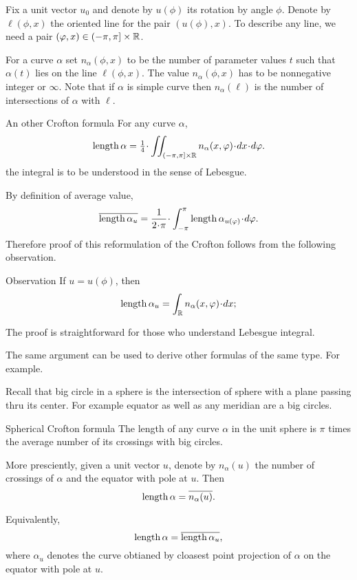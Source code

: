 Fix a unit vector $u_0$ and denote by $u(\phi)$ its rotation by angle $\phi$.
Denote by $\ell(\phi,x)$ the oriented line for the pair $(u(\phi),x)$.
To describe any line, we need a pair $(\varphi,x)\in (-\pi,\pi]\times \mathbb{R}$.

For a curve $\alpha$  set $n_\alpha(\phi,x)$ to be the number of parameter values $t$ such that $\alpha(t)$ lies on the line $\ell(\phi,x)$. 
The value $n_\alpha(\phi,x)$ has to be nonnegative integer or $\infty$.
Note that if $\alpha$ is simple curve then $n_\alpha(\ell)$ is the number of intersections of $\alpha$ with $\ell$.


\begin{thm}{An other Crofton formula}
For any curve $\alpha$,
\[\length\alpha=\tfrac14\cdot\iint_{(-\pi,\pi]\times \RR} n_\alpha(x,\phi)\cdot dx\cdot d\phi.\]
the integral is to be understood in the sense of Lebesgue.
\end{thm}

By definition of average value,
\[\overline{\length\alpha_u}
=
\frac1{2\cdot\pi}\cdot\int_{-\pi}^\pi \length\alpha_{u(\phi)}\cdot d\phi.\]
Therefore  proof of this reformulation of the Crofton follows from the following observation.

\begin{thm}{Observation}
If $u=u(\phi)$, then 
\[\length\alpha_u=\int_\RR n_\alpha(x,\phi)\cdot dx;\]

\end{thm}

The proof is straightforward for those who understand Lebesgue integral.

The same argument can be used to derive other formulas of the same type.
For example.

Recall that big circle in a sphere is the intersection of sphere with a plane passing thru its center.
For example equator as well as any meridian are a big circles.

\begin{thm}{Spherical Crofton formula}
The length of any curve $\alpha$ in the unit sphere is $\pi$ times the average number of its crossings with big circles.

More presciently, given a unit vector $u$, denote by $n_\alpha(u)$ the number of crossings of $\alpha$ and the equator with pole at $u$.
Then 
\[\mathop{\rm length}\nolimits\alpha=\overline{n_\alpha(u)}.\]

Equivalently,
\[\mathop{\rm length}\nolimits\alpha=\overline{\mathop{\rm length}\nolimits\alpha_u},\]
where $\alpha_u$ denotes the curve obtianed by cloasest point projection of $\alpha$ on the equator with pole at $u$.
\end{thm}


